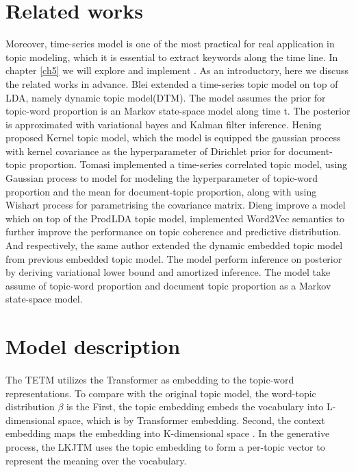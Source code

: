 \section{Related works}
Moreover, time-series model is one of the most practical for real application in topic modeling, which it is essential to extract keywords along the time line. In chapter \ref{ch5} we will explore and implement . As an introductory, here we discuss the related works in advance.
Blei \cite{blei_dynamic_2006} extended a time-series topic model on top of LDA, namely dynamic topic model(DTM). The model assumes the prior for topic-word proportion is an Markov state-space model along time t. The posterior is approximated with variational bayes and Kalman filter inference.
Hening\cite{hennig_kernel_2012} proposed Kernel topic model, which the model is equipped the gaussian process with kernel covariance as the hyperparameter of Dirichlet prior for document-topic proportion.
Tomasi\cite{tomasi_stochastic_nodate} implemented a time-series correlated topic model, using Gaussian process to model for modeling the hyperparameter of topic-word proportion and the mean for document-topic proportion, along with using Wishart process for parametrising the covariance matrix.
Dieng\cite{dieng_topic_2019} improve a model which on top of the ProdLDA topic model, implemented Word2Vec semantics to further improve the performance on topic coherence and predictive distribution. And respectively, the same author\cite{dieng_dynamic_2019} extended the dynamic embedded topic model from previous embedded topic model. The model perform inference on posterior by deriving variational lower bound and amortized inference. The model take assume of topic-word proportion and document topic proportion as a Markov state-space model.
\section{Model description}
\paragraph{}The TETM utilizes the Transformer as embedding to the topic-word representations. To compare with the original topic model, the word-topic distribution $ \beta $ is the 
First, the topic embedding embeds the vocabulary into L-dimensional space, which is by Transformer embedding. Second, the context embedding maps the embedding into K-dimensional space . 
In the generative process, the LKJTM uses the topic embedding to form a per-topic vector to represent the meaning over the vocabulary. 
